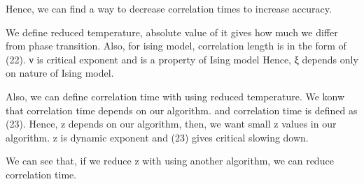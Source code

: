\documentclass[10pt, notes]{beamer}
\begin{document}
{Hence, we can find a way to decrease correlation times to increase 
accuracy.

We define reduced temperature, absolute value of it gives how much we differ from phase transition. Also, for ising model, correlation length is in the form of (22). ν is critical exponent and is a property of Ising model
Hence, ξ depends only on nature of Ising model.

Also, we can define correlation time with using reduced temperature.  We konw that correlation time depends on our algorithm. and correlation time is defined as (23). Hence, z depends on our algorithm, then, we want small z values in our algorithm. z is dynamic exponent and (23) gives critical slowing down.

We can see that, if we reduce z with using another algorithm, we can reduce correlation time. 

}
\end{document}
